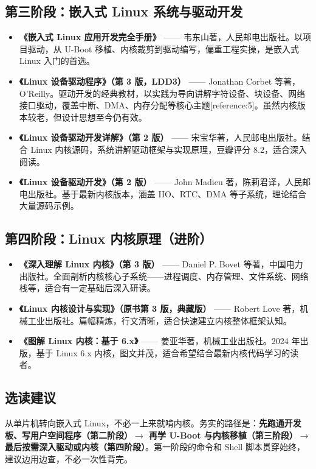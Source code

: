 \subsection*{第三阶段：嵌入式 Linux 系统与驱动开发}
\begin{itemize}
	\item \textbf{《嵌入式 Linux 应用开发完全手册》} —— 韦东山著，人民邮电出版社。以项目驱动，从 U-Boot 移植、内核裁剪到驱动编写，偏重工程实操，是嵌入式 Linux 入门的首选。
	\item \textbf{《Linux 设备驱动程序》（第 3 版，LDD3）} —— Jonathan Corbet 等著，O'Reilly。驱动开发的经典教材，以实践为导向讲解字符设备、块设备、网络接口驱动，覆盖中断、DMA、内存分配等核心主题[reference:5]。虽然内核版本较老，但设计思想至今仍有效。
	\item \textbf{《Linux 设备驱动开发详解》（第 2 版）} —— 宋宝华著，人民邮电出版社。结合 Linux 内核源码，系统讲解驱动框架与实现原理，豆瓣评分 8.2，适合深入阅读。
	\item \textbf{《Linux 设备驱动开发》（第 2 版）} —— John Madieu 著，陈莉君译，人民邮电出版社。基于最新内核版本，涵盖 IIO、RTC、DMA 等子系统，理论结合大量源码示例。
\end{itemize}

\subsection*{第四阶段：Linux 内核原理（进阶）}
\begin{itemize}
	\item \textbf{《深入理解 Linux 内核》（第 3 版）} —— Daniel P. Bovet 等著，中国电力出版社。全面剖析内核核心子系统——进程调度、内存管理、文件系统、网络栈等，适合有一定基础后深入研读。
	\item \textbf{《Linux 内核设计与实现》（原书第 3 版，典藏版）} —— Robert Love 著，机械工业出版社。篇幅精炼，行文清晰，适合快速建立内核整体框架认知。
	\item \textbf{《图解 Linux 内核：基于 6.x》} —— 姜亚华著，机械工业出版社。2024 年出版，基于 Linux 6.x 内核，图文并茂，适合希望结合最新内核代码学习的读者。
\end{itemize}

\subsection*{选读建议}
从单片机转向嵌入式 Linux，不必一上来就啃内核。务实的路径是：\textbf{先跑通开发板、写用户空间程序（第二阶段）\(\rightarrow\) 再学 U-Boot 与内核移植（第三阶段）\(\rightarrow\) 最后按需深入驱动或内核（第四阶段）}。第一阶段的命令和 Shell 脚本贯穿始终，建议边用边查，不必一次性背完。

